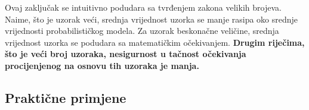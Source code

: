 Ovaj zaključak se intuitivno podudara sa tvrđenjem zakona velikih brojeva.
Naime, što je uzorak veći, srednja vrijednost uzorka se manje rasipa oko srednje
vrijednosti probabilističkog modela. Za uzorak beskonačne veličine, srednja
vrijednost uzorka se podudara sa matematičkim očekivanjem. \textbf{Drugim
riječima, što je veći broj uzoraka, nesigurnost u tačnost očekivanja
procijenjenog na osnovu tih uzoraka je manja.} %

\subsection{Praktične primjene}

